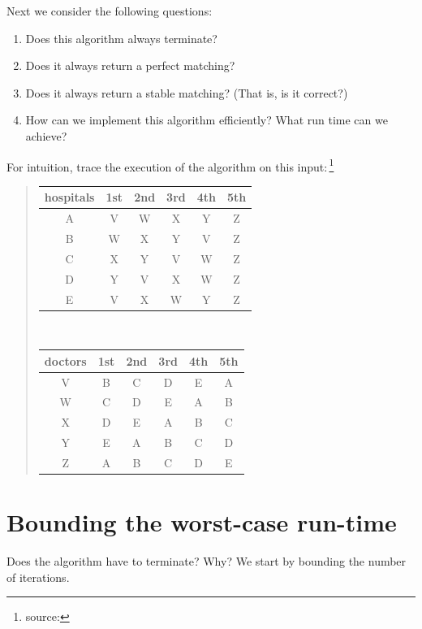 \documentclass[11pt]{article}
\begin{document}


Next we consider the following questions:

\begin{enumerate}
\item Does this algorithm always terminate?

\item Does it always return a perfect matching?

\item Does it always return a stable matching?  (That is, is it correct?)

\item How can we implement this algorithm efficiently?  What run time can we achieve?
\end{enumerate}

For intuition, trace the execution of the algorithm on this input:\,\footnote{source: \KWSlides}

\begin{quote}
  \begin{tabular}{c|ccccc}
    hospitals & 1st & 2nd & 3rd & 4th & 5th \\ \hline
    A & V & W & X & Y & Z \\
    B & W & X & Y & V & Z \\
    C & X & Y & V & W & Z \\
    D & Y & V & X & W & Z \\
    E & V & X & W & Y & Z
  \end{tabular}
  ~~~~
  \begin{tabular}{c|ccccc}
    doctors & 1st & 2nd & 3rd & 4th & 5th \\ \hline
    V & B & C & D & E & A \\
    W & C & D & E & A & B \\
    X & D & E & A & B & C \\
    Y & E & A & B & C & D \\
    Z & A & B & C & D & E
  \end{tabular}
\end{quote}

\continued 

\section{Bounding the worst-case run-time}

Does the algorithm have to terminate?  Why?
We start by bounding the number of iterations.
\end{document}
